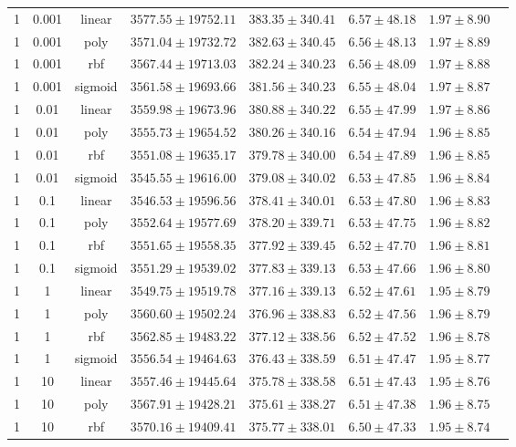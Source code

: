 \begin{tabular}{cccrrrrr}
1 & 0.001 & linear & $3577.55 \pm 19752.11$ & $383.35 \pm 340.41$ & $6.57 \pm 48.18$ & $1.97 \pm 8.90$\\
1 & 0.001 & poly & $3571.04 \pm 19732.72$ & $382.63 \pm 340.45$ & $6.56 \pm 48.13$ & $1.97 \pm 8.89$\\
1 & 0.001 & rbf & $3567.44 \pm 19713.03$ & $382.24 \pm 340.23$ & $6.56 \pm 48.09$ & $1.97 \pm 8.88$\\
1 & 0.001 & sigmoid & $3561.58 \pm 19693.66$ & $381.56 \pm 340.23$ & $6.55 \pm 48.04$ & $1.97 \pm 8.87$\\
1 & 0.01 & linear & $3559.98 \pm 19673.96$ & $380.88 \pm 340.22$ & $6.55 \pm 47.99$ & $1.97 \pm 8.86$\\
1 & 0.01 & poly & $3555.73 \pm 19654.52$ & $380.26 \pm 340.16$ & $6.54 \pm 47.94$ & $1.96 \pm 8.85$\\
1 & 0.01 & rbf & $3551.08 \pm 19635.17$ & $379.78 \pm 340.00$ & $6.54 \pm 47.89$ & $1.96 \pm 8.85$\\
1 & 0.01 & sigmoid & $3545.55 \pm 19616.00$ & $379.08 \pm 340.02$ & $6.53 \pm 47.85$ & $1.96 \pm 8.84$\\
1 & 0.1 & linear & $3546.53 \pm 19596.56$ & $378.41 \pm 340.01$ & $6.53 \pm 47.80$ & $1.96 \pm 8.83$\\
1 & 0.1 & poly & $3552.64 \pm 19577.69$ & $378.20 \pm 339.71$ & $6.53 \pm 47.75$ & $1.96 \pm 8.82$\\
1 & 0.1 & rbf & $3551.65 \pm 19558.35$ & $377.92 \pm 339.45$ & $6.52 \pm 47.70$ & $1.96 \pm 8.81$\\
1 & 0.1 & sigmoid & $3551.29 \pm 19539.02$ & $377.83 \pm 339.13$ & $6.53 \pm 47.66$ & $1.96 \pm 8.80$\\
1 & 1 & linear & $3549.75 \pm 19519.78$ & $377.16 \pm 339.13$ & $6.52 \pm 47.61$ & $1.95 \pm 8.79$\\
1 & 1 & poly & $3560.60 \pm 19502.24$ & $376.96 \pm 338.83$ & $6.52 \pm 47.56$ & $1.96 \pm 8.79$\\
1 & 1 & rbf & $3562.85 \pm 19483.22$ & $377.12 \pm 338.56$ & $6.52 \pm 47.52$ & $1.96 \pm 8.78$\\
1 & 1 & sigmoid & $3556.54 \pm 19464.63$ & $376.43 \pm 338.59$ & $6.51 \pm 47.47$ & $1.95 \pm 8.77$\\
1 & 10 & linear & $3557.46 \pm 19445.64$ & $375.78 \pm 338.58$ & $6.51 \pm 47.43$ & $1.95 \pm 8.76$\\
1 & 10 & poly & $3567.91 \pm 19428.21$ & $375.61 \pm 338.27$ & $6.51 \pm 47.38$ & $1.96 \pm 8.75$\\
1 & 10 & rbf & $3570.16 \pm 19409.41$ & $375.77 \pm 338.01$ & $6.50 \pm 47.33$ & $1.95 \pm 8.74$\\

\end{tabular}
